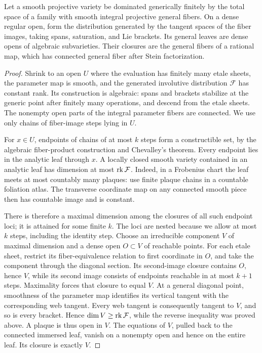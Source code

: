 \begin{lemma}\label{proj:ex:web}
Let a smooth projective variety be dominated generically finitely by
the total space of a family with smooth integral projective general
fibers. On a dense regular open, form the distribution generated by
the tangent spaces of the fiber images, taking spans, saturation,
and Lie brackets. Its general leaves are dense opens of algebraic
subvarieties. Their closures are the general fibers of a rational
map, which has connected general fiber after Stein factorization.
\end{lemma}
\begin{proof}
Shrink to an open \(U\) where the evaluation has finitely many etale
sheets, the parameter map is smooth, and the generated involutive
distribution \(\mathcal F\) has constant rank. Its construction is
algebraic: spans and brackets stabilize at the generic point after
finitely many operations, and descend from the etale sheets. The
nonempty open parts of the integral parameter fibers are connected.
We use only chains of fiber-image steps lying in \(U\).

For \(x\in U\), endpoints of chains of at most \(k\) steps form a
constructible set, by the algebraic fiber-product construction and
Chevalley's theorem. Every endpoint lies in the analytic leaf
through \(x\). A locally closed smooth variety contained in an
analytic leaf has dimension at most \(\operatorname{rk}\mathcal F\). Indeed, in a
Frobenius chart the leaf meets at most countably many plaques: use
finite plaque chains in a countable foliation atlas. The transverse
coordinate map on any connected smooth piece then has countable
image and is constant.

There is therefore a maximal dimension among the closures of all
such endpoint loci; it is attained for some finite \(k\). The loci
are nested because we allow at most \(k\) steps, including the
identity step. Choose an irreducible component \(V\) of maximal
dimension and a dense open \(O\subset V\) of reachable points.
For each etale sheet, restrict its fiber-equivalence relation to
first coordinate in \(O\), and take the component through the
diagonal section. Its second-image closure contains \(O\), hence
\(V\), while its second image consists of endpoints reachable
in at most \(k+1\) steps. Maximality forces that closure to
equal \(V\). At a general
diagonal point, smoothness of the parameter map identifies its
vertical tangent with the corresponding web tangent. Every web
tangent is consequently tangent to \(V\), and so is every bracket. Hence
\(\dim V\geq\operatorname{rk}\mathcal F\), while the reverse inequality was proved
above. A plaque is thus open in \(V\). The equations of \(V\),
pulled back to the connected immersed leaf, vanish on a nonempty
open and hence on the entire leaf. Its closure is exactly \(V\).


\end{proof}
